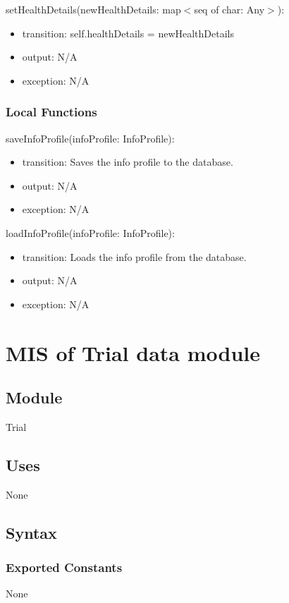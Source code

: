 \documentclass[12pt, titlepage]{article}
\begin{document}
\noindent setHealthDetails(newHealthDetails: map$<$seq of char: Any$>$):
\begin{itemize}
\item transition: self.healthDetails = newHealthDetails
\item output: N/A
\item exception: N/A
\end{itemize}

\subsubsection{Local Functions}
\noindent saveInfoProfile(infoProfile: InfoProfile):
\begin{itemize}
\item transition: Saves the info profile to the database.
\item output: N/A
\item exception: N/A
\end{itemize}

\noindent loadInfoProfile(infoProfile: InfoProfile):
\begin{itemize}
\item transition: Loads the info profile from the database.
\item output: N/A
\item exception: N/A
\end{itemize}

\newpage


\section{MIS of Trial data module}

\subsection{Module}
Trial

\subsection{Uses}
None

\subsection{Syntax}

\subsubsection{Exported Constants}
None
\end{document}
